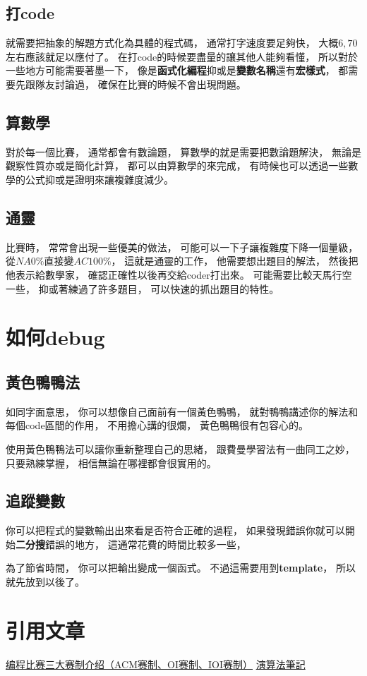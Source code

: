 \documentclass[12pt,oneside]{article}
\begin{document}
\subsection{打\textbf{code}}
就需要把抽象的解題方式化為具體的程式碼，
通常打字速度要足夠快，
大概$6, 70$左右應該就足以應付了。
在打code的時候要盡量的讓其他人能夠看懂，
所以對於一些地方可能需要著墨一下，
像是\textbf{函式化編程}抑或是\textbf{變數名稱}還有\textbf{宏樣式}，
都需要先跟隊友討論過，
確保在比賽的時候不會出現問題。

\subsection{算數學}
對於每一個比賽，
通常都會有數論題，
算數學的就是需要把數論題解決，
無論是觀察性質亦或是簡化計算，
都可以由算數學的來完成，
有時候也可以透過一些數學的公式抑或是證明來讓複雜度減少。

\subsection{通靈}
比賽時，
常常會出現一些優美的做法，
可能可以一下子讓複雜度下降一個量級，
從$NA0\%$直接變$AC100\%$，
這就是通靈的工作，
他需要想出題目的解法，
然後把他表示給數學家，
確認正確性以後再交給coder打出來。
可能需要比較天馬行空一些，
抑或著練過了許多題目，
可以快速的抓出題目的特性。

\section{如何debug}
\subsection{黃色鴨鴨法}
如同字面意思，
你可以想像自己面前有一個黃色鴨鴨，
就對鴨鴨講述你的解法和每個code區間的作用，
不用擔心講的很爛，
黃色鴨鴨很有包容心的。

使用黃色鴨鴨法可以讓你重新整理自己的思緒，
跟費曼學習法有一曲同工之妙，
只要熟練掌握，
相信無論在哪裡都會很實用的。

\subsection{追蹤變數}
你可以把程式的變數輸出出來看是否符合正確的過程，
如果發現錯誤你就可以開始\textbf{二分搜}錯誤的地方，
這通常花費的時間比較多一些，

為了節省時間，
你可以把輸出變成一個函式。
不過這需要用到\textbf{template}，
所以就先放到以後了。


\section{引用文章}
\href{https://zhuanlan.zhihu.com/p/129311302}{编程比赛三大赛制介绍（ACM赛制、OI赛制、IOI赛制）}
\href{https://web.ntnu.edu.tw/~algo/Activity.html}{演算法筆記}
\end{document}

